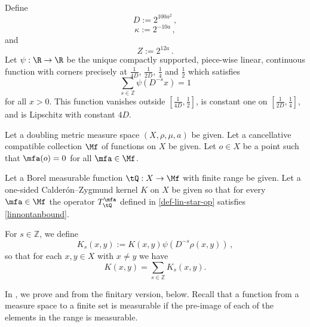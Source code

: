 Define
\begin{equation}\label{defineD}
    D:= 2^{100 a^2}\, ,
\end{equation}
\begin{equation}\label{definekappa}
    \kappa:= 2^{-10a}\,,
\end{equation}
and
\begin{equation}
    \label{defineZ}
    Z := 2^{12a}\,.
\end{equation}
Let
 $\psi:\R \to \R$ be the unique compactly supported, piece-wise linear, continuous function with corners precisely at $\frac 1{4D}$, $\frac 1{2D}$, $\frac 14$ and $\frac 12$ which satisfies
 \begin{equation}
    \label{eq-psisum}
    \sum_{s\in \mathbb{Z}} \psi(D^{-s}x)=1
\end{equation}
for all $x>0$. This function vanishes outside $[\frac1{4D},\frac 12]$, is constant one on
$[\frac1{2D},\frac 14]$, and is Lipschitz
with constant $4D$.




Let a doubling metric measure space $(X,\rho,\mu, a)$ be given.
Let a cancellative compatible collection $\Mf$ of functions on $X$ be given.
Let $o\in X$ be a point such that $\mfa(o)=0$
for all $\mfa\in \Mf$.


Let a Borel measurable function $\tQ:X\to \Mf$ with finite range be given.
Let a one-sided Calder\'on--Zygmund kernel $K$ on $X$ be given so that for every $\mfa\in \Mf$ the operator $T_{\tQ}^{\mfa}$ defined in \eqref{def-lin-star-op}
satisfies \eqref{linnontanbound}.



For $s\in\mathbb{Z}$, we define
\begin{equation}\label{defks}
    K_s(x,y):=K(x,y)\psi(D^{-s}\rho(x,y))\,,
\end{equation}
so that for each $x, y \in X$ with $x\neq y$ we have
$$K(x,y)=\sum_{s\in\mathbb{Z}}K_s(x,y).$$

In , we prove  and 
from the finitary version,  below. Recall
that a function from a measure space to a finite set is measurable if the pre-image of each of the elements in the range is measurable.


